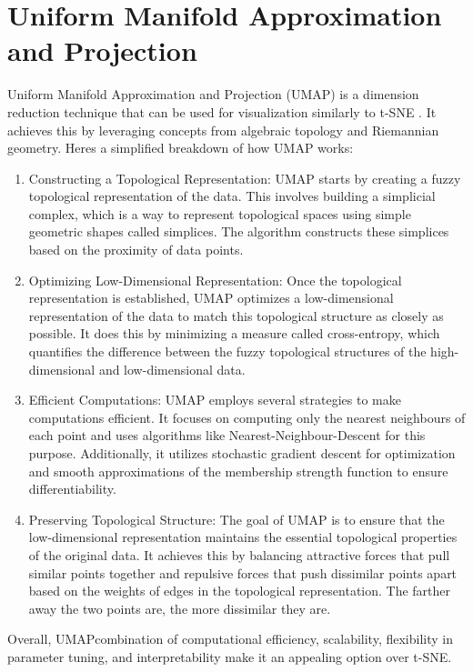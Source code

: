 \section{Uniform Manifold Approximation and Projection} \label{chap-2:umap}
Uniform Manifold Approximation and Projection (UMAP) is a dimension reduction technique that can be used for visualization similarly to t-SNE \cite{https://doi.org/10.48550/arxiv.1802.03426}. It achieves this by leveraging concepts from algebraic topology and Riemannian geometry.
Here\textquotesingle s a simplified breakdown of how UMAP works:
\begin{enumerate}
\item Constructing a Topological Representation: UMAP starts by creating a fuzzy topological representation of the data. This involves building a simplicial complex, which is a way to represent topological spaces using simple geometric shapes called simplices. The algorithm constructs these simplices based on the proximity of data points.
\item Optimizing Low-Dimensional Representation: Once the topological representation is established, UMAP optimizes a low-dimensional representation of the data to match this topological structure as closely as possible. It does this by minimizing a measure called cross-entropy, which quantifies the difference between the fuzzy topological structures of the high-dimensional and low-dimensional data.
\item Efficient Computations: UMAP employs several strategies to make computations efficient. It focuses on computing only the nearest neighbours of each point and uses algorithms like Nearest-Neighbour-Descent for this purpose. Additionally, it utilizes stochastic gradient descent for optimization and smooth approximations of the membership strength function to ensure differentiability.
\item Preserving Topological Structure: The goal of UMAP is to ensure that the low-dimensional representation maintains the essential topological properties of the original data. It achieves this by balancing attractive forces that pull similar points together and repulsive forces that push dissimilar points apart based on the weights of edges in the topological representation. The farther away the two points are, the more dissimilar they are. 
\end{enumerate}
Overall, UMAP\textquotesingle combination of computational efficiency, scalability, flexibility in parameter tuning, and interpretability make it an appealing option over t-SNE. 
